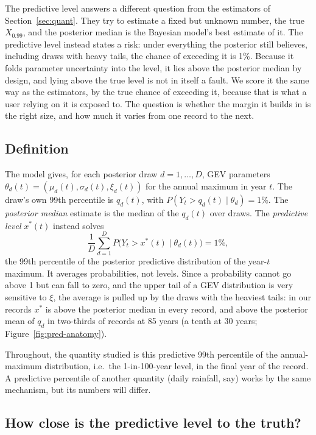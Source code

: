 \documentclass[11pt]{article}
\newcommand{\Xp}{X_{0.99}}
\newcommand{\xs}{x^{*}}
\begin{document}
The predictive level answers a different question from the estimators of
Section~\ref{sec:quant}. They try to estimate a fixed but unknown number, the true $\Xp$, and
the posterior median is the Bayesian model's best estimate of it. The predictive level instead
states a risk: under everything the posterior still believes, including draws with heavy tails,
the chance of exceeding it is 1\%. Because it folds parameter uncertainty into the level, it lies
above the posterior median by design, and lying above the true level is not in itself a fault. We score it the same way as the estimators, by the true chance of exceeding it, because that
is what a user relying on it is exposed to. The question is whether the margin it builds in is the
right size, and how much it varies from one record to the next.

\subsection{Definition}\label{sec:pred-what}


The model gives, for each posterior draw $d=1,\dots,D$, GEV parameters
$\theta_d(t)=(\mu_d(t),\sigma_d(t),\xi_d(t))$ for the annual maximum in year $t$. The draw's own
99th percentile is $q_d(t)$, with $P(Y_t>q_d(t)\mid\theta_d)=1\%$. The \emph{posterior median}
estimate is the median of the $q_d(t)$ over draws. The \emph{predictive level} $\xs(t)$ instead
solves
\begin{equation}
\frac1D\sum_{d=1}^{D} P\bigl(Y_t>\xs(t)\mid\theta_d(t)\bigr)=1\%,
\end{equation}
the 99th percentile of the posterior predictive distribution of the year-$t$ maximum. It averages
probabilities, not levels. Since a probability cannot go above 1 but can fall to zero, and the
upper tail of a GEV distribution is very sensitive to $\xi$, the average is pulled up by the draws
with the heaviest tails: in our records $\xs$ is above the posterior median in every record, and
above the posterior mean of $q_d$ in two-thirds of records at 85 years (a tenth at 30 years;
Figure~\ref{fig:pred-anatomy}).

Throughout, the quantity studied is this predictive 99th percentile of the annual-maximum
distribution, i.e.\ the 1-in-100-year level, in the final year of the record. A predictive
percentile of another quantity (daily rainfall, say) works by the same mechanism, but its numbers
will differ.

\subsection{How close is the predictive level to the truth?}\label{sec:pred-close}
\end{document}
